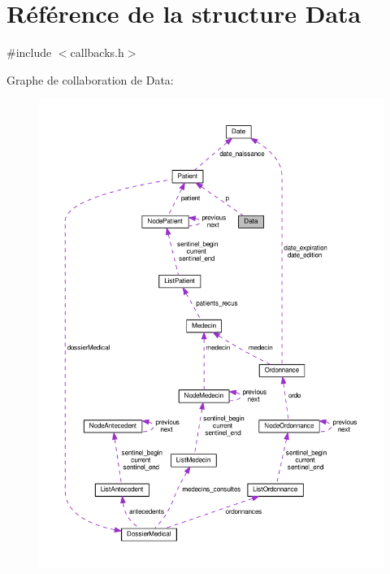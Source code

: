\hypertarget{struct_data}{\section{Référence de la structure Data}
\label{struct_data}
}


{\ttfamily \#include $<$callbacks.\-h$>$}



Graphe de collaboration de Data\-:
\nopagebreak
\begin{figure}[H]
\begin{center}
\leavevmode
\includegraphics[width=350pt]{struct_data__coll__graph}
\end{center}
\end{figure}
